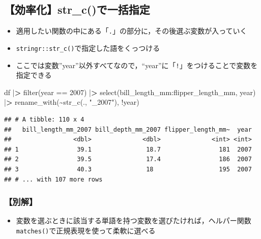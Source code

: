 \documentclass[
  xelatex,ja=standard, b5paper]{bxjsbook}
\newenvironment{Shaded}{\begin{snugshade}}{\end{snugshade}}
\newcommand{\DecValTok}[1]{\textcolor[rgb]{0.00,0.00,0.81}{#1}}
\newcommand{\ErrorTok}[1]{\textcolor[rgb]{0.64,0.00,0.00}{\textbf{#1}}}
\newcommand{\FunctionTok}[1]{\textcolor[rgb]{0.00,0.00,0.00}{#1}}
\newcommand{\NormalTok}[1]{#1}
\newcommand{\SpecialCharTok}[1]{\textcolor[rgb]{0.00,0.00,0.00}{#1}}
\newcommand{\StringTok}[1]{\textcolor[rgb]{0.31,0.60,0.02}{#1}}
\providecommand{\tightlist}{%
  \setlength{\itemsep}{0pt}\setlength{\parskip}{0pt}}
\begin{document}
\hypertarget{rename-strc}{%
\subsection{【効率化】str\_c()で一括指定}\label{rename-strc}}

\begin{itemize}
\tightlist
\item
  適用したい関数の中にある「\texttt{.}」の部分に，その後選ぶ変数が入っていく
\item
  \texttt{stringr::str\_c()}で指定した語をくっつける
\item
  ここでは変数''year''以外すべてなので，``year''に「\texttt{!}」をつけることで変数を指定できる
\end{itemize}

\begin{Shaded}
\begin{Highlighting}[]
\NormalTok{df }\SpecialCharTok{|}\ErrorTok{\textgreater{}} 
  \FunctionTok{filter}\NormalTok{(year }\SpecialCharTok{==} \DecValTok{2007}\NormalTok{) }\SpecialCharTok{|}\ErrorTok{\textgreater{}} 
  \FunctionTok{select}\NormalTok{(bill\_length\_mm}\SpecialCharTok{:}\NormalTok{flipper\_length\_mm, year) }\SpecialCharTok{|}\ErrorTok{\textgreater{}} 
  \FunctionTok{rename\_with}\NormalTok{(}\SpecialCharTok{\textasciitilde{}}\FunctionTok{str\_c}\NormalTok{(., }\StringTok{"\_2007"}\NormalTok{),}
               \SpecialCharTok{!}\NormalTok{year)}
\end{Highlighting}
\end{Shaded}

\begin{verbatim}
## # A tibble: 110 x 4
##   bill_length_mm_2007 bill_depth_mm_2007 flipper_length_mm~  year
##                 <dbl>              <dbl>              <int> <int>
## 1                39.1               18.7                181  2007
## 2                39.5               17.4                186  2007
## 3                40.3               18                  195  2007
## # ... with 107 more rows
\end{verbatim}

\hypertarget{rename-strc-other}{%
\subsubsection{【別解】}\label{rename-strc-other}}

\begin{itemize}
\tightlist
\item
  変数を選ぶときに該当する単語を持つ変数を選びたければ，ヘルパー関数\texttt{matches()}で正規表現を使って柔軟に選べる
\end{itemize}
\end{document}
